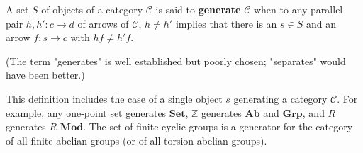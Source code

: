 A set $S$ of objects of a category $\mathcal{C}$ is said to \textbf{generate} $\mathcal{C}$ when to any parallel pair $h, h' : c \to d$ of arrows of $\mathcal{C}$, $h \neq h'$ implies that there is an $s \in S$ and an arrow $f : s \to c$ with $h f \neq h' f$.

(The term "generates" is well established but poorly chosen; "separates" would have been better.)

This definition includes the case of a single object $s$ generating a category $\mathcal{C}$. For example, any one-point set generates $\mathbf{Set}$, $\mathbb{Z}$ generates $\mathbf{Ab}$ and $\mathbf{Grp}$, and $R$ generates $R\text{-}\mathbf{Mod}$. The set of finite cyclic groups is a generator for the category of all finite abelian groups (or of all torsion abelian groups).
